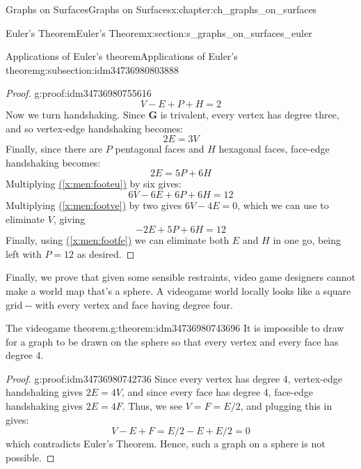 \documentclass[oneside,10pt,]{book}
\newcommand{\xreffont}{\relax}
\numberwithin{equation}{section}
\newcommand{\bfG}{\mathbf{G}}
\begin{document}
\begin{chapterptx}{Graphs on Surfaces}{}{Graphs on Surfaces}{}{}{x:chapter:ch_graphs_on_surfaces}
\begin{sectionptx}{Euler's Theorem}{}{Euler's Theorem}{}{}{x:section:s_graphs_on_surfaces_euler}
\begin{subsectionptx}{Applications of Euler's theorem}{}{Applications of Euler's theorem}{}{}{g:subsection:idm34736980803888}
\begin{proof}{}{g:proof:idm34736980755616}
%
\begin{equation}
V-E+P+H=2\label{x:men:footeu}
\end{equation}
Now we turn handshaking.  Since \(\bfG\) is trivalent, every vertex has degree three, and so vertex-edge handshaking becomes:%
%
\begin{equation}
2E=3V\label{x:men:footve}
\end{equation}
Finally, since there are \(P\) pentagonal faces and \(H\) hexagonal faces, face-edge handshaking becomes:%
%
\begin{equation}
2E=5P+6H\label{x:men:footfe}
\end{equation}
Multiplying \hyperref[x:men:footeu]{({\xreffont\ref{x:men:footeu}})} by six gives:%
%
\begin{equation*}
6V-6E+6P+6H=12
\end{equation*}
Multiplying \hyperref[x:men:footve]{({\xreffont\ref{x:men:footve}})} by two gives \(6V-4E=0\), which we can use to eliminate \(V\), giving%
%
\begin{equation*}
-2E+5P+6H=12
\end{equation*}
Finally, using \hyperref[x:men:footfe]{({\xreffont\ref{x:men:footfe}})} we can eliminate both \(E\) and \(H\) in one go, being left with \(P=12\) as desired.%
\end{proof}
Finally, we prove that given some sensible restraints, video game designers cannot make a world map that's a sphere.  A videogame world locally looks like a square grid -{}-{} with every vertex and face having degree four.%
\begin{theorem}{The videogame theorem.}{}{g:theorem:idm34736980743696}%
It is impossible to draw for a graph to be drawn on the sphere so that every vertex and every face has degree 4.%
\end{theorem}
\begin{proof}{}{g:proof:idm34736980742736}
Since every vertex has degree 4, vertex-edge handshaking gives \(2E=4V\), and since every face has degree 4, face-edge handshaking gives \(2E=4F\).  Thus, we see \(V=F=E/2\), and plugging this in gives:%
%
\begin{equation*}
V-E+F=E/2-E+E/2=0
\end{equation*}
which contradicts Euler's Theorem.  Hence, such a graph on a sphere is not possible.%
\end{proof}
\end{subsectionptx}
\end{sectionptx}
%
%
\typeout{************************************************}

\end{chapterptx}
\end{document}
